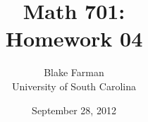 \documentclass[10pt]{amsart}
\author{Blake Farman\\University of South Carolina}
\title{Math 701:\\Homework 04}
\date{September 28, 2012}
\begin{document}
\maketitle

\newcommand{\Inn}[1]{\operatorname{Inn}\left(#1\right)}
\newcommand{\Aut}[1]{\operatorname{Aut}\left(#1\right)}
\newcommand{\cntr}[1]{\mathbf{Z}\left(#1\right)}
\newcommand{\abs}[1]{\left| #1 \right|}
\newcommand{\SL}[2]{\operatorname{SL}_#1\left(#2\right)}
\newcommand{\Mat}[2]{\operatorname{Mat}_{#1}\left(#2\right)}
\newcommand{\orbit}[1]{\mathcal{O}_{#1}}
\newcommand{\real}[1]{\operatorname{\mathfrak{Re}}\left(#1\right)}
\newcommand{\imag}[1]{\operatorname{\mathfrak{Im}}\left(#1\right)}
\newcommand{\uhp}{\mathfrak{h}}

\renewcommand{\qedsymbol}{\ensuremath{\blacksquare}}

\newtheorem{thm}{}
\newtheorem{lem}{Lemma}
\end{document}
